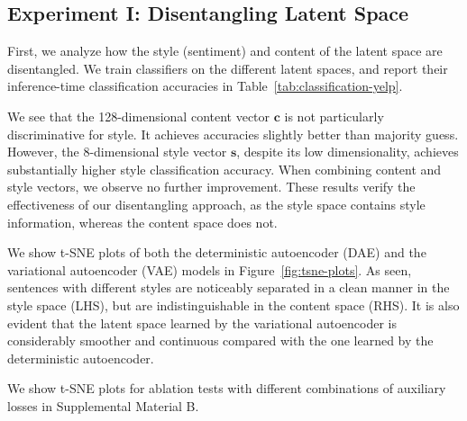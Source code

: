 \documentclass[letterpaper]{article} %
\begin{document}
\subsection{Experiment I: Disentangling Latent Space}

First, we analyze how the style (sentiment) and content of the latent space are disentangled.
We train classifiers on the different latent spaces, and report their inference-time classification accuracies in Table~\ref{tab:classification-yelp}.

We see that the 128-dimensional content vector $\bm c$ is not particularly discriminative for style.
It achieves accuracies slightly better than majority guess.
However, the 8-dimensional style vector $\bm s$, despite its low dimensionality, achieves substantially higher style classification accuracy.
When combining content and style vectors, we observe no further improvement.
These results verify the effectiveness of our disentangling approach, as the style space contains style information, whereas the content space does not.

We show t-SNE plots of both the deterministic autoencoder (DAE) and the variational autoencoder (VAE) models in Figure~\ref{fig:tsne-plots}.
As seen, sentences with different styles are noticeably separated in a clean manner in the style space (LHS), but are indistinguishable in the content space (RHS).
It is also evident that the latent space learned by the variational autoencoder is considerably smoother and continuous compared with the one learned by the deterministic autoencoder.

We show t-SNE plots for ablation tests with different combinations of auxiliary losses in Supplemental Material B.
\end{document}
